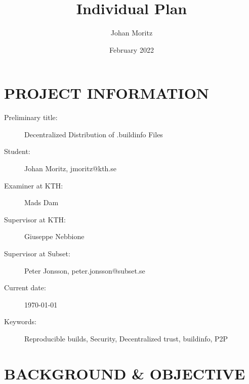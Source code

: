 \documentclass{article}
\title{Individual Plan}
\author{Johan Moritz}
\date{February 2022}
\begin{document}
\maketitle




\section*{PROJECT INFORMATION}

\begin{description}
	\item[Preliminary title:]  Decentralized Distribution of .buildinfo Files
	\item[Student:]  Johan Moritz, jmoritz@kth.se
	\item[Examiner at KTH:]  Mads Dam
	\item[Supervisor at KTH:]  Giuseppe Nebbione
	\item[Supervisor at Subset:]  Peter Jonsson, peter.jonsson@subset.se
	\item[Current date:]  \today
	\item[Keywords:]  Reproducible builds, Security, Decentralized trust, buildinfo, P2P 
\end{description}

\section*{BACKGROUND \& OBJECTIVE}
\end{document}
